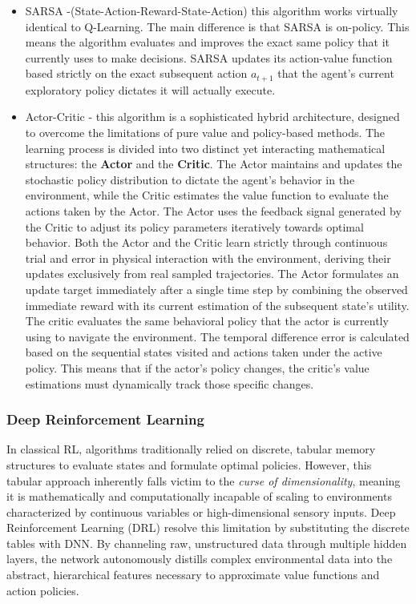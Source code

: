 \begin{itemize}
 	\item SARSA -(State-Action-Reward-State-Action) this algorithm works virtually identical to Q-Learning. The main difference is that SARSA is on-policy. This means the algorithm evaluates and improves the exact same policy that it currently uses to make decisions. SARSA updates its action-value function based strictly on the exact subsequent action $a_{t+1}$ that the agent's current exploratory policy dictates it will actually execute. \cite{NaeemMuddasar2020AGIt} 
 	
 	\item Actor-Critic - this algorithm is a sophisticated hybrid architecture, designed to overcome the limitations of pure value and policy-based methods. The learning process is divided into two distinct yet interacting mathematical structures: the \textbf{Actor} and the \textbf{Critic}. The Actor maintains and updates the stochastic policy distribution to dictate the agent's behavior in the environment, while the Critic estimates the value function to evaluate the actions taken by the Actor. The Actor uses the feedback signal generated by the Critic to adjust its policy parameters iteratively towards optimal behavior. Both the Actor and the Critic learn strictly through continuous trial and error in physical interaction with the environment, deriving their updates exclusively from real sampled trajectories. The Actor formulates an update target immediately after a single time step by combining the observed immediate reward with its current estimation of the subsequent state's utility. The critic evaluates the same behavioral policy that the actor is currently using to navigate the environment. The temporal difference error is calculated based on the sequential states visited and actions taken under the active policy. This means that if the actor's policy changes, the critic's value estimations must dynamically track those specific changes.
 	 \cite{NaeemMuddasar2020AGIt} 
 \end{itemize}
 
 \subsubsection{Deep Reinforcement Learning}
\label{Enhancement_tech_1}

 In classical RL, algorithms traditionally relied on discrete, tabular memory structures to evaluate states and formulate optimal policies. However, this tabular approach inherently falls victim to the \textit{curse of dimensionality}, meaning it is mathematically and computationally incapable of scaling to environments characterized by continuous variables or high-dimensional sensory inputs. Deep Reinforcement Learning (DRL) resolve this limitation by substituting the discrete tables with DNN. By channeling raw, unstructured data through multiple hidden layers, the network autonomously distills complex environmental data into the abstract, hierarchical features necessary to approximate value functions and action policies. 
 
